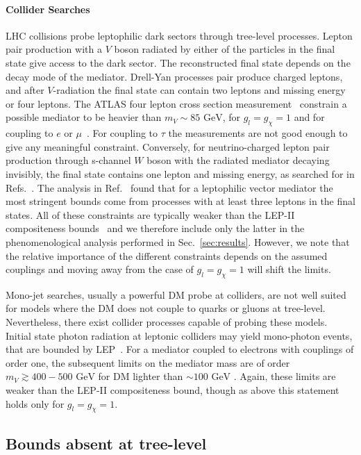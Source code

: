 \documentclass[final,5p,twocolumn]{elsarticle}
\newcommand{\Ref}[1]{Ref.~\cite{#1}}
\begin{document}
\paragraph{Collider Searches} LHC collisions probe leptophilic dark sectors through tree-level processes. Lepton pair production with a $V$ boson radiated by either of the particles in the final state give access to the dark sector. The reconstructed final state depends on the decay mode of the mediator. Drell-Yan processes pair produce charged leptons, and after $V$-radiation the final state can contain two leptons and missing energy or four leptons. The ATLAS four lepton cross section measurement~\cite{Aad:2014wra} constrain a possible mediator to be heavier than $m_V \sim 85 \,\,\mathrm{GeV}$, for $g_l = g_\chi = 1$ and for coupling to $e$ or $\mu$~\cite{Bell:2014tta}. For coupling to $\tau$ the measurements are not good enough to give any meaningful constraint. Conversely, for neutrino-charged lepton pair production through s-channel $W$ boson with the radiated mediator decaying invisibly, the final state contains one lepton and missing energy, as searched for in Refs.~\cite{ATLAS:2014wra,Khachatryan:2014tva}. The analysis in \Ref{delAguila:2014soa} found that for a leptophilic vector mediator the most stringent bounds come from processes with at least three leptons in the final states. All of these constraints are typically weaker than the LEP-II compositeness bounds~\cite{LEP:2003aa} and we therefore include only the latter in the phenomenological analysis performed in Sec.~\ref{sec:results}. However, we note that the relative importance of the different constraints depends on the assumed couplings and moving away from the case of $g_l = g_\chi = 1$ will shift the limits. 

Mono-jet searches, usually a powerful DM probe at colliders, are not well suited for models where the DM does not couple to quarks or gluons at tree-level. Nevertheless, there exist collider processes capable of probing these models. Initial state photon radiation at leptonic colliders may yield mono-photon events, that are bounded by LEP~\cite{Abdallah:2003np,Abdallah:2008aa}. For a mediator coupled to electrons with couplings of order one, the subsequent limits on the mediator mass are of order $m_V \gtrsim 400 - 500 \,\,\mathrm{GeV}$ for DM lighter than $\sim 100 \,\,\mathrm{GeV}$ \cite{Fox:2011fx}. Again, these limits are weaker than the LEP-II compositeness bound, though as above this statement holds only for $g_l = g_\chi = 1$.

\subsection{Bounds absent at tree-level}
\label{sec:absent}
\end{document}
